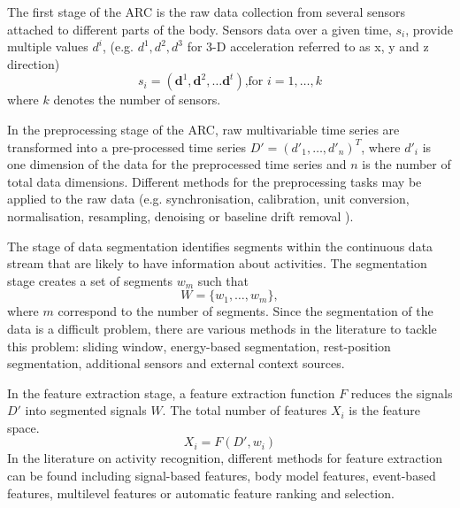 \documentclass[10pt,journal,compsoc]{IEEEtran}
\begin{document}
The first stage of the ARC is the raw data collection from several sensors attached to 
different parts of the body. Sensors data over a given time, $s_i$, provide multiple values  $d^i$, 
(e.g. $d^1, d^2, d^3$ for 3-D acceleration referred to as x, y and z direction)
\begin{equation}
s_i = (\textbf{d}^1, \textbf{d}^2,\dots \textbf{d}^t) \mbox{,for } i=1, \dots,k
\end{equation} 
where $k$ denotes the number of sensors. 

In the preprocessing stage of the ARC, raw multivariable time series are transformed into a 
pre-processed time series $D'= (d'_1, \dots, d'_n )^T$, where $d'_i$ is one dimension 
of the data for the preprocessed time series and $n$ is the number of total data dimensions.
Different methods for the preprocessing tasks may be applied to the raw data
(e.g. synchronisation, calibration, unit conversion, normalisation, resampling, denoising 
or baseline drift removal \cite{bulling2014}).

The stage of data segmentation identifies segments within the continuous data stream
that are likely to have information about activities. The segmentation stage creates 
a set of segments $w_m$ %
such that 
\begin{equation}
W = \{   w_1, \dots, w_m  \},
\end{equation} 
where $m$ correspond to the number of segments.
Since the segmentation of the data is a difficult problem, there are various methods 
in the literature to tackle this problem: sliding window, energy-based segmentation, 
rest-position segmentation, additional sensors and external context sources.

In the feature extraction stage, a feature extraction function $F$ reduces
the signals $D'$  into segmented signals $W$.
The total number of features $X_i$ is the feature space.
\begin{equation}
X_i = F ( D', w_i)
\end{equation} 
In the literature on activity recognition, different  methods for feature extraction 
can be found including signal-based features, body model features, event-based features, 
multilevel features or automatic feature ranking and selection.
\end{document}
